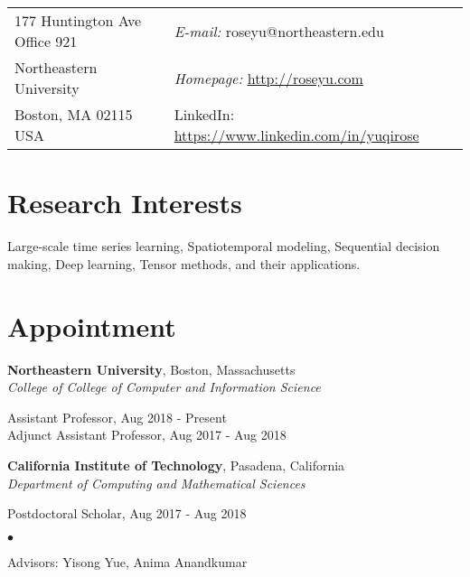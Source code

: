 \documentclass[margin,line]{res}
\newenvironment{list1}{
  \begin{list}{\ding{113}}{%
      \setlength{\itemsep}{0in}
      \setlength{\parsep}{0in} \setlength{\parskip}{0in}
      \setlength{\topsep}{0in} \setlength{\partopsep}{0in} 
      \setlength{\leftmargin}{0.17in}}}{\end{list}}
\newenvironment{list2}{
  \begin{list}{$\bullet$}{%
      \setlength{\itemsep}{0in}
      \setlength{\parsep}{0in} \setlength{\parskip}{0in}
      \setlength{\topsep}{0in} \setlength{\partopsep}{0in} 
      \setlength{\leftmargin}{0.2in}}}{\end{list}}
\begin{document}
\begin{resume}
\section{\sc }
\vspace{.05in}
\begin{tabular}{@{}p{2in}p{4in}}
177 Huntington Ave Office 921 & {\it E-mail:}  roseyu@northeastern.edu  \\   
Northeastern University &  {\it Homepage:} \url{http://roseyu.com} \\            
Boston, MA 02115 USA    & {LinkedIn:}  \url{https://www.linkedin.com/in/yuqirose}\\     
\end{tabular}


\section{\sc Research Interests}
Large-scale time series learning, Spatiotemporal modeling, Sequential decision making, Deep learning, Tensor methods, and their applications.

\section{\sc Appointment}
{\bf Northeastern University}, Boston, Massachusetts \\
{\em College of College of Computer and Information Science } 
\begin{list1}
	\item[] Assistant Professor,  Aug 2018 - Present \\
	Adjunct Assistant Professor, Aug 2017 - Aug 2018  
	\vspace*{.05in}
\end{list1}

{\bf California Institute of Technology}, Pasadena, California\\
{\em Department of Computing and Mathematical Sciences} 
\begin{list1}
	\item[] Postdoctoral Scholar,  Aug 2017 - Aug 2018
	\begin{list2}
		\vspace*{.05in}
		\item Advisors:  Yisong Yue, Anima Anandkumar
	\end{list2}
	\vspace*{.05in}
\end{list1}




\end{resume}
\end{document}
